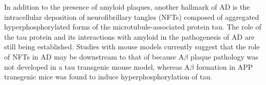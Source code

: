 In addition to the presence of amyloid plaques, another hallmark of AD is the intracellular deposition of neurofibrillary tangles (NFTs) composed of aggregated hyperphosphorylated forms of the microtubule-associated protein tau.\cite{Ballatore:2007ir} %
The role of the tau protein and its interactions with amyloid in the pathogenesis of AD are still being established.\cite{Ittner:2010he} Studies with mouse models currently suggest that the role of NFTs in AD may be downstream to that of \abeta because A$\beta$ plaque pathology was not developed in a tau transgenic mouse model, whereas A$\beta$ formation in APP transgenic mice was found to induce hyperphosphorylation of tau.\cite{Gotz:2004dr} 


